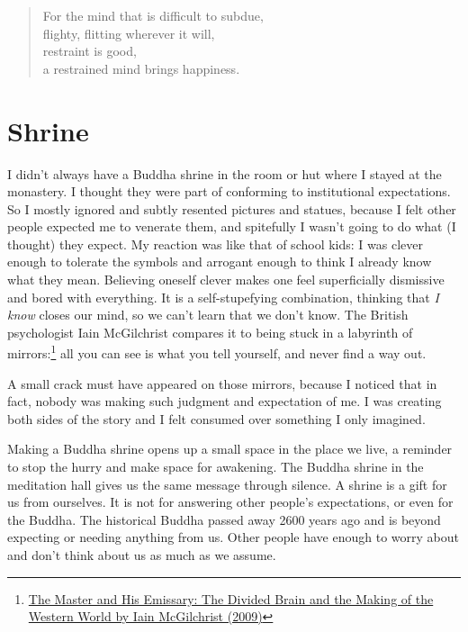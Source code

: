 \begin{quote}
For the mind that is difficult to subdue,\\
flighty, flitting wherever it will,\\
restraint is good,\\
a restrained mind brings happiness.

\bigskip

\end{quote}

\clearpage

\section{Shrine}


I didn't always have a Buddha shrine in the room or hut where I stayed
at the monastery. I thought they were part of conforming to
institutional expectations. So I mostly ignored and subtly resented
pictures and statues, because I felt other people expected me to
venerate them, and spitefully I wasn't going to do what (I thought) they
expect. My reaction was like that of school kids: I was clever enough to
tolerate the symbols and arrogant enough to think I already know what
they mean. Believing oneself clever makes one feel superficially
dismissive and bored with everything. It is a self-stupefying
combination, thinking that \emph{I know} closes our mind, so we can't
learn that we don't know. The British psychologist Iain McGilchrist
compares it to being stuck in a labyrinth of mirrors:\footnote{\href{https://www.goodreads.com/book/show/6968772-the-master-and-his-emissary}{The
  Master and His Emissary: The Divided Brain and the Making of the
  Western World by Iain McGilchrist (2009)}} all you can see is what you
tell yourself, and never find a way out.

A small crack must have appeared on those mirrors, because I noticed
that in fact, nobody was making such judgment and expectation of me. I
was creating both sides of the story and I felt consumed over something
I only imagined.

Making a Buddha shrine opens up a small space in the place we live, a
reminder to stop the hurry and make space for awakening. The Buddha
shrine in the meditation hall gives us the same message through silence.
A shrine is a gift for us from ourselves. It is not for answering other
people's expectations, or even for the Buddha. The historical Buddha
passed away 2600 years ago and is beyond expecting or needing anything
from us. Other people have enough to worry about and don't think about
us as much as we assume.

